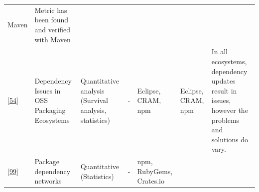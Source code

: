 \documentclass[]{book}
\begin{document}
\begin{longtable}[]{@{}lllllll@{}}
\begin{minipage}[t]{0.12\columnwidth}
Maven\strut
\end{minipage} & \begin{minipage}[t]{0.10\columnwidth}\raggedright\strut
Metric has been found and verified with Maven\strut
\end{minipage}\tabularnewline
\begin{minipage}[t]{0.09\columnwidth}\raggedright\strut
{[}\protect\hyperlink{ref-Decan2017}{54}{]}\strut
\end{minipage} & \begin{minipage}[t]{0.16\columnwidth}\raggedright\strut
Dependency Issues in OSS Packaging Ecosystems\strut
\end{minipage} & \begin{minipage}[t]{0.17\columnwidth}\raggedright\strut
Quantitative analysis (Survival analysis, statistics)\strut
\end{minipage} & \begin{minipage}[t]{0.07\columnwidth}\raggedright\strut
-\strut
\end{minipage} & \begin{minipage}[t]{0.10\columnwidth}\raggedright\strut
Eclipse, CRAM, npm\strut
\end{minipage} & \begin{minipage}[t]{0.12\columnwidth}\raggedright\strut
Eclipse, CRAM, npm\strut
\end{minipage} & \begin{minipage}[t]{0.10\columnwidth}\raggedright\strut
In all ecosystems, dependency updates result in issues, however the
problems and solutions do vary.\strut
\end{minipage}\tabularnewline
\begin{minipage}[t]{0.09\columnwidth}\raggedright\strut
{[}\protect\hyperlink{ref-Kikas2017}{99}{]}\strut
\end{minipage} & \begin{minipage}[t]{0.16\columnwidth}\raggedright\strut
Package dependency networks\strut
\end{minipage} & \begin{minipage}[t]{0.17\columnwidth}\raggedright\strut
Quantitative (Statistics)\strut
\end{minipage} & \begin{minipage}[t]{0.07\columnwidth}\raggedright\strut
-\strut
\end{minipage} & \begin{minipage}[t]{0.10\columnwidth}\raggedright\strut
npm, RubyGems, Crates.io\strut
\end{minipage} & \begin{minipage}[t]{0.12\columnwidth}\raggedright\strut

\end{minipage}
\end{longtable}
\end{document}
